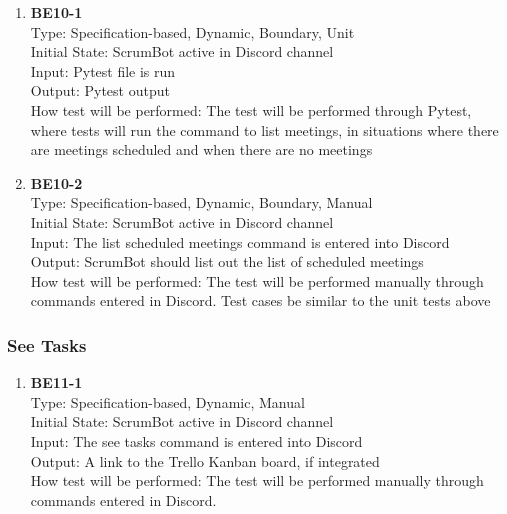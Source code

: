 \documentclass[12pt, titlepage]{article}
\begin{document}
\begin{enumerate}
    \item{\textbf{BE10-1}}\\
    Type: Specification-based, Dynamic, Boundary, Unit\\
    Initial State: ScrumBot active in Discord channel\\
    Input: Pytest file is run\\
    Output: Pytest output\\
    How test will be performed: The test will be performed through Pytest, where tests will run the command to list meetings, in situations where there are meetings scheduled and when there are no meetings\\
    
    \item{\textbf{BE10-2}}\\
    Type: Specification-based, Dynamic, Boundary, Manual\\
    Initial State: ScrumBot active in Discord channel\\
    Input: The list scheduled meetings command is entered into Discord\\
    Output: ScrumBot should list out the list of scheduled meetings\\
    How test will be performed: The test will be performed manually through commands entered in Discord. Test cases be similar to the unit tests above\\
\end{enumerate}

\subsubsection{See Tasks}

\begin{enumerate}
    \item{\textbf{BE11-1}}\\
    Type: Specification-based, Dynamic, Manual\\
    Initial State: ScrumBot active in Discord channel\\
    Input: The see tasks command is entered into Discord\\
    Output: A link to the Trello Kanban board, if integrated\\
    How test will be performed: The test will be performed manually through commands entered in Discord.\\
\end{enumerate}
\end{document}
